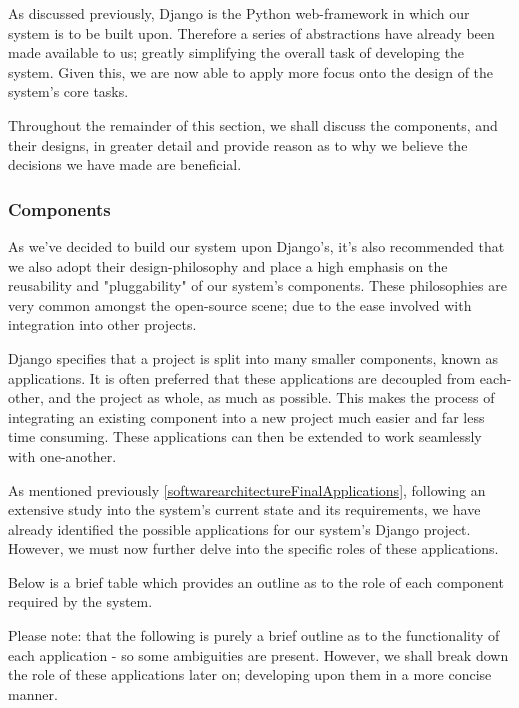 		As discussed previously, Django is the Python web-framework in which our system is to be built upon. Therefore a series of abstractions have already been made available to us; greatly simplifying the overall task of developing the system. Given this, we are now able to apply more focus onto the design of the system's core tasks.
		
		Throughout the remainder of this section, we shall discuss the components, and their designs, in greater detail and provide reason as to why we believe the decisions we have made are beneficial.
	
	\subsubsection{Components}
		As we've decided to build our system upon Django's, it's also recommended that we also adopt their design-philosophy and place a high emphasis on the reusability and "pluggability" of our system's components. These philosophies are very common amongst the open-source scene; due to the ease involved with integration into other projects.
		
		Django specifies that a project is split into many smaller components, known as applications. It is often preferred that these applications are decoupled from each-other, and the project as whole, as much as possible. This makes the process of integrating an existing component into a new project much easier and far less time consuming. These applications can then be extended to work seamlessly with one-another.
		
		As mentioned previously \ref{softwarearchitectureFinalApplications}, following an extensive study into the system's current state and its requirements, we have already identified the possible applications for our system's Django project. However, we must now further delve into the specific roles of these applications.
		
		Below is a brief table which provides an outline as to the role of each component required by the system.
		
		Please note: that the following is purely a brief outline as to the functionality of each application - so some ambiguities are present.
		However, we shall break down the role of these applications later on; developing upon them in a more concise manner.
		
